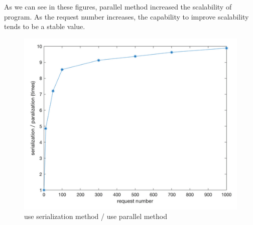 \documentclass{article}
\begin{document}
As we can see in these figures, parallel method increased the scalability of program. As the request number increases, the capability to improve scalability tends to be a stable value.

\begin{figure}[h!]
\centering
\includegraphics[scale=0.5]{Snip}
\caption{ use serialization method / use parallel method }
\label{fig:Snip}
\end{figure}
\end{document}
